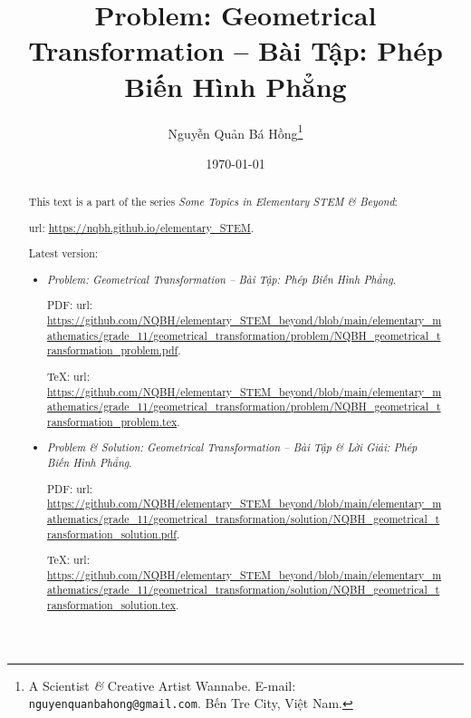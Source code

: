 \documentclass{article}
\title{Problem: Geometrical Transformation -- Bài Tập: Phép Biến Hình Phẳng}
\author{Nguyễn Quản Bá Hồng\footnote{A Scientist {\it\&} Creative Artist Wannabe. E-mail: {\tt nguyenquanbahong@gmail.com}. Bến Tre City, Việt Nam.}}
\date{\today}
\begin{document}
\maketitle
\begin{abstract}
	This text is a part of the series {\it Some Topics in Elementary STEM \& Beyond}:
	
	{\sc url}: \url{https://nqbh.github.io/elementary_STEM}.
	
	Latest version:
	\begin{itemize}
		\item {\it Problem: Geometrical Transformation -- Bài Tập: Phép Biến Hình Phẳng}.
		
		PDF: {\sc url}: \url{https://github.com/NQBH/elementary_STEM_beyond/blob/main/elementary_mathematics/grade_11/geometrical_transformation/problem/NQBH_geometrical_transformation_problem.pdf}.
		
		\TeX: {\sc url}: \url{https://github.com/NQBH/elementary_STEM_beyond/blob/main/elementary_mathematics/grade_11/geometrical_transformation/problem/NQBH_geometrical_transformation_problem.tex}.
		\item {\it Problem \& Solution: Geometrical Transformation -- Bài Tập \& Lời Giải: Phép Biến Hình Phẳng}.
		
		PDF: {\sc url}: \url{https://github.com/NQBH/elementary_STEM_beyond/blob/main/elementary_mathematics/grade_11/geometrical_transformation/solution/NQBH_geometrical_transformation_solution.pdf}.
		
		\TeX: {\sc url}: \url{https://github.com/NQBH/elementary_STEM_beyond/blob/main/elementary_mathematics/grade_11/geometrical_transformation/solution/NQBH_geometrical_transformation_solution.tex}.
	\end{itemize}
\end{abstract}
\tableofcontents

\end{document}
